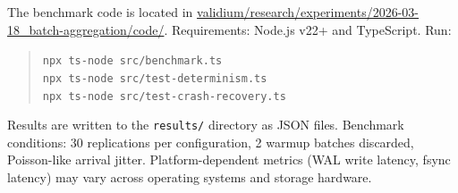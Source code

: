 The benchmark code is located in
\url{validium/research/experiments/2026-03-18_batch-aggregation/code/}.
Requirements: Node.js v22+ and TypeScript. Run:

\begin{quote}
\small
\texttt{npx ts-node src/benchmark.ts}\\
\texttt{npx ts-node src/test-determinism.ts}\\
\texttt{npx ts-node src/test-crash-recovery.ts}
\end{quote}

Results are written to the \texttt{results/} directory as JSON files.
Benchmark conditions: 30 replications per configuration, 2 warmup batches
discarded, Poisson-like arrival jitter. Platform-dependent metrics (WAL
write latency, fsync latency) may vary across operating systems and
storage hardware.
